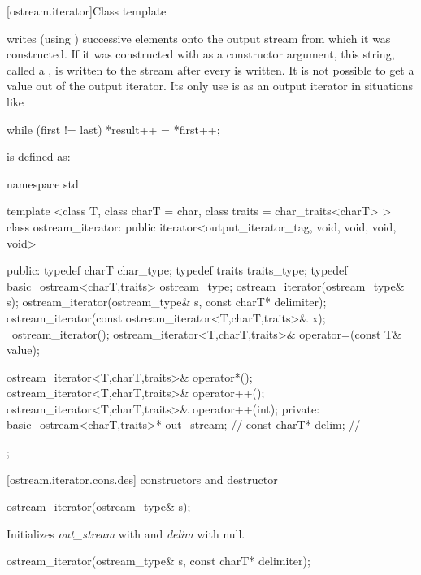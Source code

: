 [ostream.iterator]{Class template }

\pnum
{}%
writes (using
)
successive elements onto the output stream from which it was constructed.
If it was constructed with
as a constructor argument, this string, called a
,
is written to the stream after every
is written.
It is not possible to get a value out of the output iterator.
Its only use is as an output iterator in situations like

\begin{codeblock}
while (first != last)
  *result++ = *first++;
\end{codeblock}

\pnum
{}
is defined as:

\begin{codeblock}
namespace std {
  template <class T, class charT = char, class traits = char_traits<charT> >
  class ostream_iterator:
    public iterator<output_iterator_tag, void, void, void, void> {
  public:
    typedef charT char_type;
    typedef traits traits_type;
    typedef basic_ostream<charT,traits> ostream_type;
    ostream_iterator(ostream_type& s);
    ostream_iterator(ostream_type& s, const charT* delimiter);
    ostream_iterator(const ostream_iterator<T,charT,traits>& x);
   ~ostream_iterator();
    ostream_iterator<T,charT,traits>& operator=(const T& value);

    ostream_iterator<T,charT,traits>& operator*();
    ostream_iterator<T,charT,traits>& operator++();
    ostream_iterator<T,charT,traits>& operator++(int);
  private:
    basic_ostream<charT,traits>* out_stream;  // \expos
    const charT* delim;                       // \exposr
  };
}
\end{codeblock}

[ostream.iterator.cons.des]{ constructors and destructor}


%
\begin{itemdecl}
ostream_iterator(ostream_type& s);
\end{itemdecl}

\begin{itemdescr}
\pnum
\effects
Initializes \textit{out_stream} with  and \textit{delim} with null.
\end{itemdescr}


%
\begin{itemdecl}
ostream_iterator(ostream_type& s, const charT* delimiter);
\end{itemdecl}

